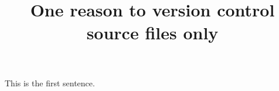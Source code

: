 \documentclass{article}
\title{One reason to version control source files only}
\begin{document}
\maketitle

This is the first sentence.
\end{document}
